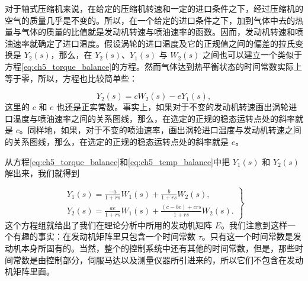对于轴式压缩机来说，在给定的压缩机转速和一定的进口条件之下，经过压缩机的空气的质量几乎是不变的。所以，在一个给定的进口条件之下，加到气体中去的热量与气体的质量的比值就是发动机转速与喷油速率的函数。因而，发动机转速和喷油速率就确定了进口温度。假设涡轮的进口温度及它的正规值之间的偏差的拉氏变换是 $Y_2(s)$，那么，在 $Y_2(s)$、$Y_1(s)$ 与 $W_2(s)$ 之间也可以建立一个类似于方程\eqref{eq:ch5_torque_balance}的方程。然而气体达到热平衡状态的时间常数实际上等于零，所以，方程也比较简单些：

\begin{equation}\label{eq:ch5_temp_balance}
Y_2(s) = cW_2(s) - eY_1(s),
\end{equation}
这里的 $c$ 和 $e$ 也还是正实常数。事实上，如果对于不变的发动机转速画出涡轮进口温度与喷油速率之间的关系图线，那么，在选定的正规的稳态运转点处的斜率就是 $c$。同样地，如果，对于不变的喷油速率，画出涡轮进口温度与发动机转速之间的关系图线，那么，在选定的正规的稳态运转点处的斜率就是 $e$。

从方程\eqref{eq:ch5_torque_balance}和\eqref{eq:ch5_temp_balance}中把 $Y_1(s)$ 和 $Y_2(s)$ 解出来，我们就得到

\begin{equation}\label{eq:ch5_engine_matrix_eq}
\left.
\begin{array}{l}
Y_1(s) = \frac{-a}{1+rs}W_1(s) + \frac{b}{1+rs}W_2(s), \\
Y_2(s) = \frac{ae}{1+rs}W_1(s) + \frac{(c-be)+crs}{1+rs}W_2(s).
\end{array}
\right\}
\end{equation}
这个方程组就给出了我们在理论分析中所用的发动机矩阵 $E$。我们注意到这样一个有趣的事实：在发动机矩阵里只包含一个时间常数 $\tau$。只有这一个时间常数是发动机本身所固有的。当然，整个的控制系统中还有其他的时间常数，但是，那些时间常数是由控制部分，伺服马达以及测量仪器所引进来的，所以它们不包含在发动机矩阵里面。

